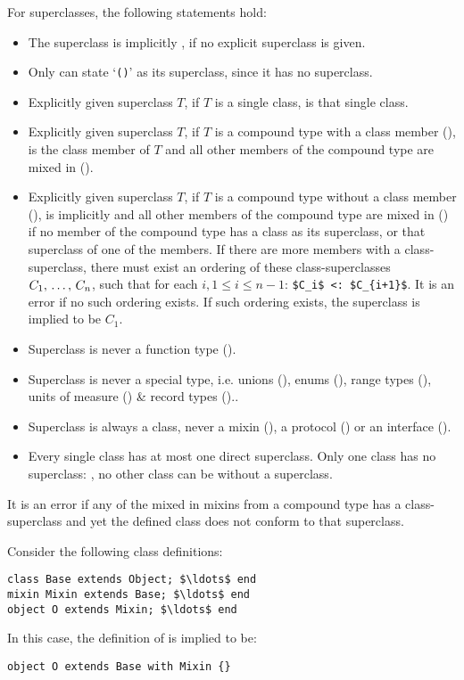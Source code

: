 For superclasses, the following statements hold:
\begin{itemize}
\item The superclass is implicitly , if no explicit superclass is given.
\item Only  can state `\lstinline!()!' as its superclass, since it has no superclass. 
\item Explicitly given superclass $T$, if $T$ is a single class, is that single class. 
\item Explicitly given superclass $T$, if $T$ is a compound type with a class member (), is the class member of $T$ and all other members of the compound type are mixed in (). 
\item Explicitly given superclass $T$, if $T$ is a compound type without a class member (), is implicitly  and all other members of the compound type are mixed in () if no member of the compound type has a class as its superclass, or that superclass of one of the members. If there are more members with a class-superclass, there must exist an ordering of these class-superclasses $C_1 ,\, \ldots ,\, C_n$, such that for each $i, 1 \le i \le n-1$: \lstinline!$C_i$ <: $C_{i+1}$!. It is an error if no such ordering exists. If such ordering exists, the superclass is implied to be $C_1$. 
\item Superclass is never a function type (). 
\item Superclass is never a special type, i.e. unions (), enums (), range types (), units of measure () \& record types ().. 
\item Superclass is always a class, never a mixin (), a protocol () or an interface (). 
\item Every single class has at most one direct superclass. Only one class has no superclass: , no other class can be without a superclass. 
\end{itemize}

It is an error if any of the mixed in mixins from a compound type has a class-superclass and yet the defined class does not conform to that superclass. 

\example Consider the following class definitions:
\begin{lstlisting}
class Base extends Object; $\ldots$ end
mixin Mixin extends Base; $\ldots$ end
object O extends Mixin; $\ldots$ end
\end{lstlisting}
In this case, the definition of  is implied to be:
\begin{lstlisting}
object O extends Base with Mixin {}
\end{lstlisting}

